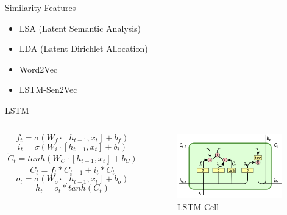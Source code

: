 \documentclass[aspectratio=169]{beamer}
\begin{document}
    \begin{frame}{Similarity Features}
      \begin{itemize}
        \item LSA (Latent Semantic Analysis)
        \item LDA (Latent Dirichlet Allocation)
        \item Word2Vec
        \item LSTM-Sen2Vec
      \end{itemize}
    \end{frame}

    \begin{frame}{LSTM}
      \begin{columns}
      \begin{column}[t]{0.6\textwidth}
        \begin{equation}
           f_t = \sigma(W_f \cdot [h_{t-1}, x_t] + b_f)
        \end{equation}
        \begin{equation}
           i_t = \sigma(W_i \cdot [h_{t-1}, x_t] + b_i)
        \end{equation}
        \begin{equation}
           \tilde{C}_t = tanh(W_C \cdot [h_{t-1}, x_t] + b_C) 
        \end{equation}
        \begin{equation}
           C_t = f_t * C_{t-1} + i_t * \tilde{C}_t
        \end{equation}
        \begin{equation}
           o_t = \sigma(W_o \cdot [h_{t-1}, x_t] + b_o)
        \end{equation}
        \begin{equation}
           h_t = o_t * tanh(C_t)
        \end{equation}
      \end{column}

      \begin{column}[t]{0.4\textwidth}
        \begin{figure}
        \includegraphics[width=1.8in,height=1.1in]{lstm2.png}
        \caption{LSTM Cell}
        \end{figure}
      \end{column}

      \end{columns}
      
    \end{frame}
\end{document}
